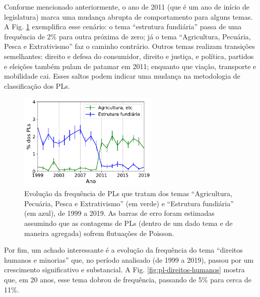 \documentclass[12pt,a4paper]{article}
\begin{document}
Conforme mencionado anteriormente, o ano de 2011 (que é um ano de início de legislatura)
marca uma mudança abrupta de comportamento para alguns temas. A Fig. \ref{fig:pl-agricultura}
exemplifica esse cenário: o tema ``estrutura fundiária'' passa de uma frequência de 2\% para outra
próxima de zero; já o tema ``Agricultura, Pecuária, Pesca e Extrativismo'' faz o caminho contrário.
Outros temas realizam transições semelhantes: direito e defesa do consumidor, direito e justiça, e
política, partidos e eleições também pulam de patamar em 2011; enquanto que viação, transporte e
mobilidade cai. Esses saltos podem indicar uma mudança na metodologia de classificação dos PLs.

\begin{figure}[H]
\centering
\includegraphics[width=0.6\textwidth]{graficos/PL-agricultura-por-ano_2019-05-01.pdf}
\caption{Evolução da frequência de PLs que tratam dos temas ``Agricultura, Pecuária, Pesca e Extrativismo''
  (em verde) e ``Estrutura fundiária'' (em azul), de 1999 a 2019. As barras de erro foram estimadas
assumindo que as contagems de PLs (dentro de um dado tema e de maneira agregada) sofrem flutuações de Poisson.}
\label{fig:pl-agricultura}
\end{figure}

Por fim, um achado interessante é a evolução da frequência do tema ``direitos humanos e minorias'' que,
no período analisado (de 1999 a 2019), passou por um crescimento significativo e substancial.
A Fig. \ref{fig:pl-direitos-humanos} mostra que, em 20 anos, esse tema dobrou de frequência, passando de
5\% para cerca de 11\%.
\end{document}
